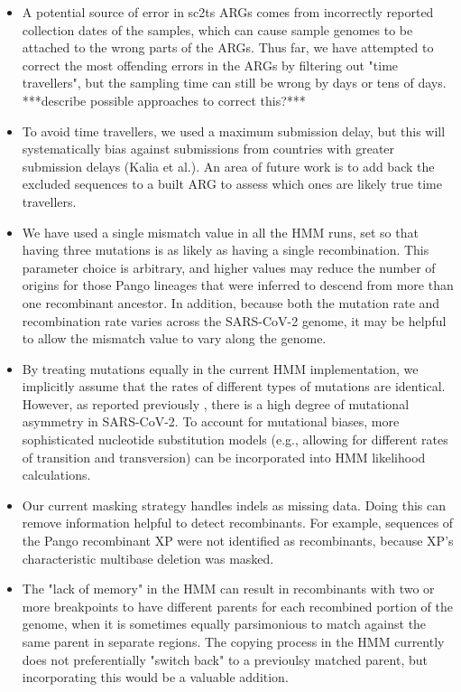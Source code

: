 \documentclass{article}
\begin{document}
\begin{itemize}
\item A potential source of error in sc2ts ARGs comes from incorrectly reported collection dates of the samples, which can cause sample genomes to be attached to the wrong parts of the ARGs. Thus far, we have attempted to correct the most offending errors in the ARGs by filtering out "time travellers", but the sampling time can still be wrong by days or tens of days. ***describe possible approaches to correct this?***
\item To avoid time travellers, we used a maximum submission delay, but this will systematically bias against submissions from countries with greater submission delays (Kalia et al.). An area of future work is to add back the excluded sequences to a built ARG to assess which ones are likely true time travellers.
\item We have used a single mismatch value in all the HMM runs, set so that having three mutations is as likely as having a single recombination. This parameter choice is arbitrary, and higher values may reduce the number of origins for those Pango lineages that were inferred to descend from more than one recombinant ancestor. In addition, because both the mutation rate and recombination rate varies across the SARS-CoV-2 genome, it may be helpful to allow the mismatch value to vary along the genome.
\item By treating mutations equally in the current HMM implementation, we implicitly assume that the rates of different types of mutations are identical. However, as reported previously \citep{Yi2021-sc}, there is a high degree of mutational asymmetry in SARS-CoV-2. To account for mutational biases, more sophisticated nucleotide substitution models (e.g., allowing for different rates of transition and transversion) can be incorporated into HMM likelihood calculations.
\item Our current masking strategy handles indels as missing data. Doing this can remove information helpful to detect recombinants. For example, sequences of the Pango recombinant XP were not identified as recombinants, because XP’s characteristic multibase deletion was masked.
\item The "lack of memory" in the HMM can result in  recombinants with two or more breakpoints to have different parents for each recombined portion of the genome, when it is sometimes equally parsimonious to match against the same parent in separate regions. The copying process in the HMM currently does not preferentially "switch back" to a previoulsy matched parent, but incorporating this would be a valuable addition.

\end{itemize}
\end{document}
